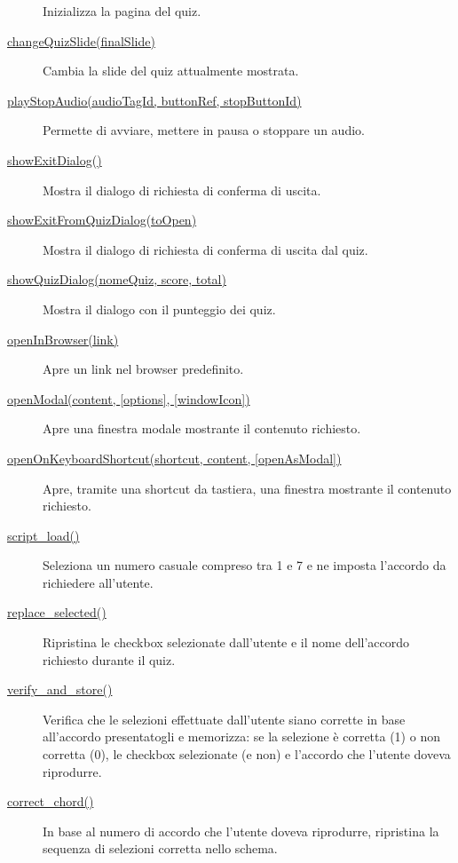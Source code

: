 \begin{description}
Inizializza la pagina del quiz.
\item[{ \protect\hyperlink{changeQuizSlide}{changeQuizSlide(finalSlide)}
}]
Cambia la slide del quiz attualmente mostrata.
\item[{ \protect\hyperlink{playStopAudio}{playStopAudio(audioTagId,
buttonRef, stopButtonId)} }]
Permette di avviare, mettere in pausa o stoppare un audio.
\item[{ \protect\hyperlink{showExitDialog}{showExitDialog()} }]
Mostra il dialogo di richiesta di conferma di uscita.
\item[{
\protect\hyperlink{showExitFromQuizDialog}{showExitFromQuizDialog(toOpen)}
}]
Mostra il dialogo di richiesta di conferma di uscita dal quiz.
\item[{ \protect\hyperlink{showQuizDialog}{showQuizDialog(nomeQuiz,
score, total)} }]
Mostra il dialogo con il punteggio dei quiz.
\item[{ \protect\hyperlink{openInBrowser}{openInBrowser(link)} }]
Apre un link nel browser predefinito.
\item[{ \protect\hyperlink{openModal}{openModal(content, {[}options{]},
{[}windowIcon{]})} }]
Apre una finestra modale mostrante il contenuto richiesto.
\item[{
\protect\hyperlink{openOnKeyboardShortcut}{openOnKeyboardShortcut(shortcut,
content, {[}openAsModal{]})} }]
Apre, tramite una shortcut da tastiera, una finestra mostrante il
contenuto richiesto.
\item[{ \protect\hyperlink{script_load}{script\_load()} }]
Seleziona un numero casuale compreso tra 1 e 7 e ne imposta l'accordo da
richiedere all'utente.
\item[{ \protect\hyperlink{replace_selected}{replace\_selected()} }]
Ripristina le checkbox selezionate dall'utente e il nome dell'accordo
richiesto durante il quiz.
\item[{ \protect\hyperlink{verify_and_store}{verify\_and\_store()} }]
Verifica che le selezioni effettuate dall'utente siano corrette in base
all'accordo presentatogli e memorizza: se la selezione è corretta (1) o
non corretta (0), le checkbox selezionate (e non) e l'accordo che
l'utente doveva riprodurre.
\item[{ \protect\hyperlink{correct_chord}{correct\_chord()} }]
In base al numero di accordo che l'utente doveva riprodurre, ripristina
la sequenza di selezioni corretta nello schema.
\end{description}

\protect\hypertarget{accordo}{}{}

